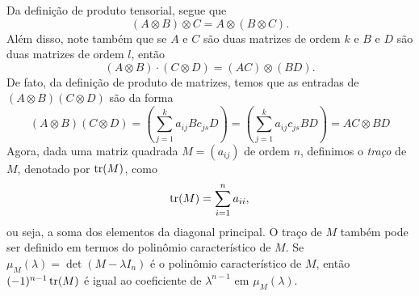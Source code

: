 	Da definição de produto tensorial, segue que
	\begin{equation}
	\label{propriedade 1 tensorial}
	    (A\otimes B)\otimes C = A\otimes(B\otimes C).
	\end{equation}
	Além disso, note também que se $A$ e $C$ são duas matrizes de ordem $k$ e $B$ e 
	$D$ são duas matrizes de ordem $l$, então
	\begin{equation}
	\label{propriedade 2 tensorial}
	    (A\otimes B)\cdot(C\otimes D) = (AC)\otimes (BD).
	\end{equation}
	De fato, da definição de produto de matrizes, temos que as entradas de 
	$(A\otimes B)(C\otimes D)$ são da forma
	\begin{equation*}
	    (A\otimes B)(C\otimes D) = \left(\displaystyle{ \sum_{j=1}^{k}a_{ij}Bc_{js}D}\right) 
	    = \left(\displaystyle{ \sum_{j=1}^{k}a_{ij}c_{js}}BD\right) = AC\otimes BD 
	\end{equation*}
	Agora, dada uma matriz quadrada $M = (a_{ij})$ de ordem $n$, definimos o \textit{traço} 
	de $M$, denotado por $\operatorname{tr}(M)$, como
	\begin{equation*}
	    \operatorname{tr}(M) = \sum_{i=1}^{n}a_{ii},
	\end{equation*}
	ou seja, a soma dos elementos da diagonal principal. O traço de $M$ também 
	pode ser definido em termos do polinômio característico de $M$. 
	Se $\mu_M(\lambda) = \det(M - \lambda I_n)$ é o polinômio característico 
	de $M$, então $(-1)^{n-1}\operatorname{tr}(M)$ é igual ao coeficiente de $\lambda^{n-1}$ em $\mu_M(\lambda)$. %
	
